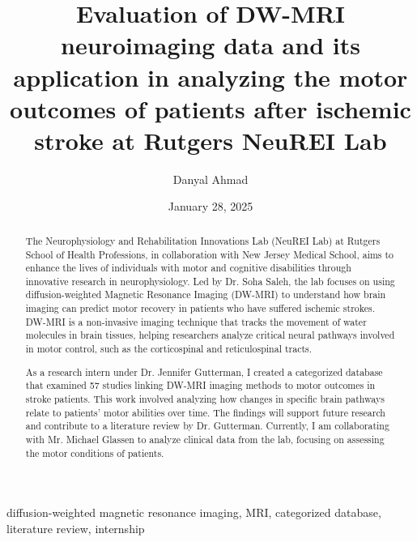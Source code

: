 ﻿\documentclass[12pt,conference,onecolumn]{IEEEtran}
\title{Evaluation of DW-MRI neuroimaging data and its application in analyzing the motor outcomes of patients after ischemic stroke at Rutgers NeuREI Lab}
\author{Danyal Ahmad}
\date{January 28, 2025}
\newcommand{\keywords}{diffusion-weighted magnetic resonance imaging, MRI, categorized database, literature review, internship}
\begin{document}
\maketitle 

\begin{abstract}
The Neurophysiology and Rehabilitation Innovations Lab (NeuREI Lab) at Rutgers School of Health Professions, in collaboration with New Jersey Medical School, aims to enhance the lives of individuals with motor and cognitive disabilities through innovative research in neurophysiology. Led by Dr. Soha Saleh, the lab focuses on using diffusion-weighted Magnetic Resonance Imaging (DW-MRI) to understand how brain imaging can predict motor recovery in patients who have suffered ischemic strokes. DW-MRI is a non-invasive imaging technique that tracks the movement of water molecules in brain tissues, helping researchers analyze critical neural pathways involved in motor control, such as the corticospinal and reticulospinal tracts.

As a research intern under Dr. Jennifer Gutterman, I created a categorized database that examined 57 studies linking DW-MRI imaging methods to motor outcomes in stroke patients. This work involved analyzing how changes in specific brain pathways relate to patients' motor abilities over time. The findings will support future research and contribute to a literature review by Dr. Gutterman. Currently, I am collaborating with Mr. Michael Glassen to analyze clinical data from the lab, focusing on assessing the motor conditions of patients.
\end{abstract}

\begin{IEEEkeywords}
\keywords
\end{IEEEkeywords}
\end{document}
